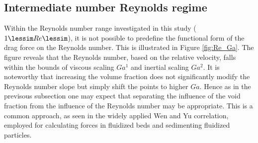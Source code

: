 









\subsection{Intermediate number Reynolds regime}


Within the Reynolds number range investigated in this study ($1 \lessim Re \lessim$), it is not possible to predefine the functional form of the drag force on the Reynolds number. This is illustrated in Figure \ref{fig:Re_Ga}. The figure reveals that the Reynolds number, based on the relative velocity, falls within the bounds of viscous scaling $Ga^1$ and inertial scaling $Ga^2$. It is noteworthy that increasing the volume fraction does not significantly modify the Reynolds number slope but simply shift the points to higher $Ga$. Hence as in the previsous subsection one may expect that separating the influence of the void fraction from the influence of the Reynolds number may be appropriate. This is a common approach, as seen in the widely applied Wen and Yu correlation, employed for calculating forces in fluidized beds and sedimenting fluidized particles.


